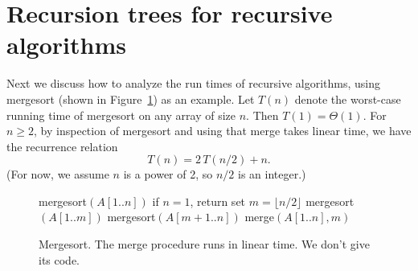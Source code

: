 \newpage

\section{Recursion trees for recursive algorithms}\label{dc: sec: recursion trees}
Next we discuss how to analyze the run times of recursive algorithms,
using \textsf{mergesort} (shown in Figure~\ref{dc: fig: mergesort}) as an example.
Let $T(n)$ denote the worst-case running time of \textsf{mergesort} on any array of size $n$.
Then $T(1) = \Theta(1)$.
For $n\ge 2$, by inspection of \textsf{mergesort} and
using that \textsf{merge} takes linear time, we have the recurrence relation
\[
  T(n) = 2\, T(n/2) + n.
\]
(For now, we assume $n$ is a power of 2, so $n/2$ is an integer.)
\begin{figure}
\begin{myframed}
\begin{steps}
  \item[] {\sf mergesort}$(A[1..n])$
  \step if $n = 1$, return
  \step set $m= \lfloor n/2\rfloor$
  \step \textsf{mergesort}$(A[1..m])$ 
  \step \textsf{mergesort}$(A[m+1..n])$ 
  \step \textsf{merge}$(A[1..n], m)$ 
\end{steps}
\end{myframed}
\caption{Mergesort. The \textsf{merge} procedure runs in linear time.  We don't give its code.}\label{dc: fig: mergesort}
\end{figure}


